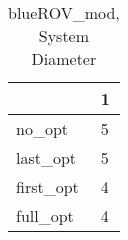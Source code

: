 \begin{table}
\caption{blueROV\_mod, System Diameter}
\label{blueROV_mod_diam}
\begin{tabular}{ll}
\toprule
 & 1 \\
\midrule
no\_opt & 5 \\
last\_opt & 5 \\
first\_opt & 4 \\
full\_opt & 4 \\
\bottomrule
\end{tabular}
\end{table}
